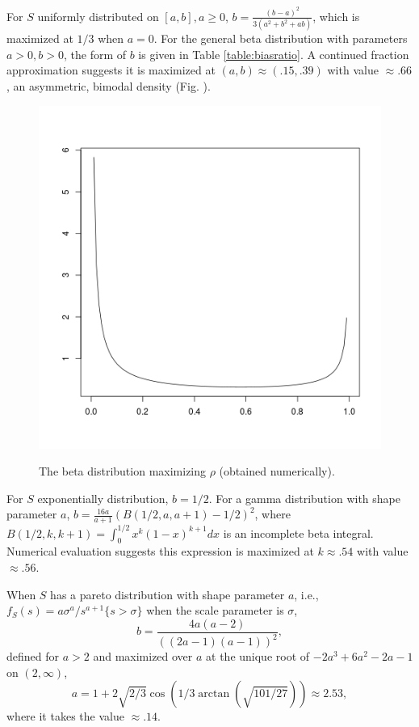\documentclass[12pt]{article}
\newcommand{\E}{E}
\newcommand{\biasratio}{b}%
\begin{document}
  For $S$ uniformly distributed on $[a,b], a\ge 0$,
  $\biasratio = \frac{(b-a)^2}{3(a^2+b^2+ab)}$, which is maximized at
  $1/3$ when $a=0$. For the general beta distribution with parameters
  $a>0,b>0$, the form of $\biasratio$ is given in Table
  \ref{table:biasratio}. A continued fraction approximation suggests
  it is maximized at $(a,b)\approx (.15,.39)$ with value
  $\approx .66$, an asymmetric, bimodal density (Fig. ).
\begin{figure}
    \centering
    \includegraphics[scale=.5]{beta.png}
    \label{fig:1}
    \caption{The beta distribution maximizing $\rho$ (obtained numerically).}
\end{figure}
  
  For $S$ exponentially distribution, $\biasratio = 1/2$. For a gamma
  distribution with shape parameter $a$,
  $\biasratio=\frac{16a}{a+1}(B(1/2,a,a+1)-1/2)^2$, where
  $B(1/2,k,k+1)=\int_0^{1/2}x^k(1-x)^{k+1}dx$ is an incomplete beta
  integral. Numerical evaluation suggests this expression is maximized
  at $k\approx .54$ with value $\approx .56$.

  
  When $S$ has a pareto distribution with shape parameter $a$, i.e., $f_S(s) =a\sigma^a/s^{a+1}\{s>\sigma\}$ when the scale parameter is $\sigma$,
  $$
  \biasratio = \frac{4a(a-2)}{((2a-1)(a-1))^2},
  $$
  defined for $a>2$ and maximized over $a$ at the unique root of $-2a^3+6a^2-2a-1$ on $(2,\infty)$,
  $$
  a=1+2\sqrt{2/3}\cos\left( 1/3\arctan\left(\sqrt{101/27}\right)  \right) \approx 2.53,
  $$
  where it takes the value $\approx .14$.
\end{document}
